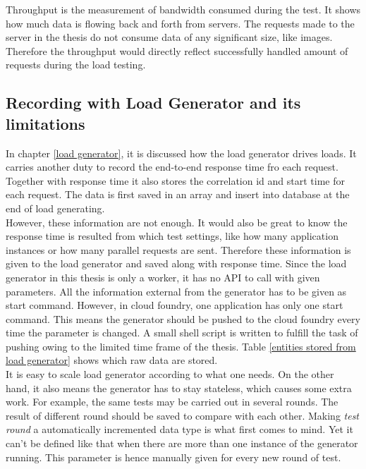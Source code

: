 Throughput is the measurement of bandwidth consumed during the test. It shows how much data is flowing back and forth from servers. The requests made to the server in the thesis do not consume data of any significant size, like images. Therefore the throughput would directly reflect successfully handled amount of requests during the load testing. \\
\subsection{Recording with Load Generator and its limitations}
 In chapter \ref{load generator}, it is discussed how the load generator drives loads. It carries another duty to record the end-to-end response time fro each request. Together with response time it also stores the correlation id and start time for each request. The data is first saved in an array and insert into database at the end of load generating. \\
 However, these information are not enough. It would also be great to know the response time is resulted from which test settings, like how many application instances or how many parallel requests are sent. Therefore these information is given to the load generator and saved along with response time. Since the load generator in this thesis is only a worker, it has no API to call with given parameters. All the information external from the generator has to be given as start command. However, in cloud foundry, one application has only one start command. This means the generator should be pushed to the cloud foundry every time the parameter is changed. A small shell script is written to fulfill the task of pushing owing to the limited time frame of the thesis. Table \ref{entities stored from load generator} shows which raw data are stored. \\
 
 It is easy to scale load generator according to what one needs. On the other hand, it also means the generator has to stay stateless, which causes some extra work. For example, the same tests may be carried out in several rounds. The result of different round should be saved to compare with each other. Making \textit{test round }a automatically incremented data type is what first comes to mind. Yet it can't be defined like that when there are more than one instance of the generator running. This parameter is hence manually given for every new round of test.\\
 
